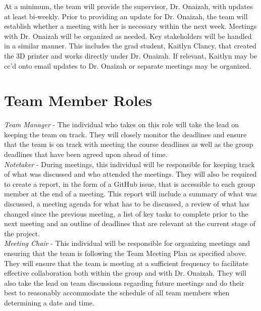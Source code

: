 \documentclass{article}
\begin{document}
At a minimum, the team will provide the supervisor, Dr. Onaizah, with updates at least bi-weekly. Prior to providing
an update for Dr. Onaizah, the team will establish whether a meeting with her is necessary within the next week.
Meetings with Dr. Onaizah will be organized as needed. Key stakeholders will be handled in a similar manner. This
includes the grad student, Kaitlyn Clancy, that created the 3D printer and works directly under Dr. Onaizah. If relevant, Kaitlyn 
may be cc’d onto email updates to Dr. Onaizah or separate meetings may be organized.

\section{Team Member Roles}

\iffalse
\wss{You should identify the types of roles you anticipate, like notetaker,
leader, meeting chair, reviewer.  Assigning specific people to those roles is
not necessary at this stage.  In a student team the role of the individuals will
likely change throughout the year.}
\fi

\textit{Team Manager} - The individual who takes on this role will take the lead on keeping the team on track. They
will closely monitor the deadlines and ensure that the team is on track with meeting the course deadlines as well as
the group deadlines that have been agreed upon ahead of time.\\

\textit{Notetaker} - During meetings, this individual will be responsible for keeping track of what was discussed
and who attended the meetings. They will also be required to create a report, in the form of a GitHub issue, that is accessible to each group member
at the end of a meeting. This report will include a summary of what was discussed, a meeting agenda for what has to
be discussed, a review of what has changed since the previous meeting, a list of key tasks to complete prior to the
next meeting and an outline of deadlines that are relevant at the current stage of the project.\\

\textit{Meeting Chair} - This individual will be responsible for organizing meetings and ensuring that the team is
following the Team Meeting Plan as specified above. They will ensure that the team is meeting at a sufficient
frequency to facilitate effective collaboration both within the group and with Dr. Onaizah. They will also take
the lead on team discussions regarding future meetings and do their best to reasonably accommodate the schedule of
all team members when determining a date and time.\\
\end{document}
